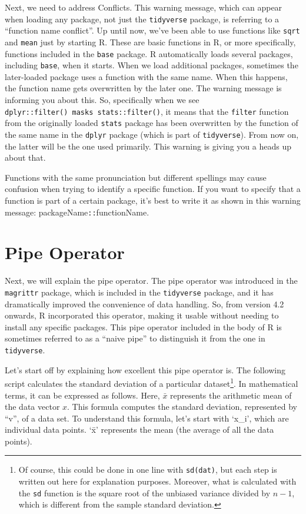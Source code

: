 \documentclass[
  a4paper,
]{book}
\begin{document}
Next, we need to address Conflicts. This warning message, which can
appear when loading any package, not just the \texttt{tidyverse}
package, is referring to a ``function name conflict''. Up until now,
we've been able to use functions like \texttt{sqrt} and \texttt{mean}
just by starting R. These are basic functions in R, or more
specifically, functions included in the \texttt{base} package. R
automatically loads several packages, including \texttt{base}, when it
starts. When we load additional packages, sometimes the later-loaded
package uses a function with the same name. When this happens, the
function name gets overwritten by the later one. The warning message is
informing you about this. So, specifically when we see
\texttt{dplyr::filter()\ masks\ stats::filter()}, it means that the
\texttt{filter} function from the originally loaded \texttt{stats}
package has been overwritten by the function of the same name in the
\texttt{dplyr} package (which is part of \texttt{tidyverse}). From now
on, the latter will be the one used primarily. This warning is giving
you a heads up about that.

Functions with the same pronunciation but different spellings may cause
confusion when trying to identify a specific function. If you want to
specify that a function is part of a certain package, it's best to write
it as shown in this warning message: packageName\texttt{::}functionName.

\section{Pipe Operator}\label{pipe-operator}

Next, we will explain the pipe operator. The pipe operator was
introduced in the \texttt{magrittr} package, which is included in the
\texttt{tidyverse} package, and it has dramatically improved the
convenience of data handling. So, from version 4.2 onwards, R
incorporated this operator, making it usable without needing to install
any specific packages. This pipe operator included in the body of R is
sometimes referred to as a ``naive pipe'' to distinguish it from the one
in \texttt{tidyverse}.

Let's start off by explaining how excellent this pipe operator is. The
following script calculates the standard deviation of a particular
dataset\footnote{Of course, this could be done in one line with
  \texttt{sd(dat)}, but each step is written out here for explanation
  purposes. Moreover, what is calculated with the \texttt{sd} function
  is the square root of the unbiased variance divided by \(n-1\), which
  is different from the sample standard deviation.}. In mathematical
terms, it can be expressed as follows. Here, \(\bar {x}\) represents the
arithmetic mean of the data vector \(x\). This formula computes the
standard deviation, represented by ``v'', of a data set. To understand
this formula, let's start with `x\_i', which are individual data points.
`x̄' represents the mean (the average of all the data points).
\end{document}
